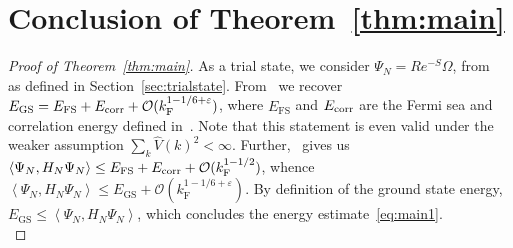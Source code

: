 \documentclass[12pt,a4paper]{article}
\numberwithin{equation}{section}
\newcommand{\cO}{\mathcal{O}}
\newcommand{\1}{\mathbb{I}}
\newcommand{\corr}{\textnormal{corr}}
\newcommand{\F}{\mathrm{F}}
\newcommand{\FS}{\mathrm{FS}}
\newcommand{\GS}{\mathrm{GS}}
\newcommand{\eva}[1]{\left\langle #1 \right\rangle}
\theoremstyle{plain}
\theoremstyle{definition}
\theoremstyle{remark}
\theoremstyle{plain}
\theoremstyle{definition}
\theoremstyle{remark}
\begin{document}
\section{Conclusion of Theorem~\ref{thm:main}}
\label{sec:mainthmproof}

\begin{proof}[Proof of Theorem~\ref{thm:main}]
As a trial state, we consider $ \Psi_N = R e^{-S} \Omega $, from~\cite{CHN23} as defined in Section~\ref{sec:trialstate}. From~\cite[Corr.~1.3]{CHN24} we recover $ E_{\GS} = E_{\FS} + E_{\corr} + \cO(k_{\F}^{1 - 1/6 + \varepsilon}) $, where $ E_{\FS} $ and $ E_{\corr} $ are the Fermi sea and correlation energy defined in~\cite[(1.2) and (1.11)]{CHN24}. Note that this statement is even valid under the weaker assumption $ \sum_k \hat{V}(k)^2 < \infty $. Further,~\cite[Thm.~1.1]{CHN23} gives us $ \eva{\Psi_N, H_N \Psi_N} \le E_{\FS} + E_{\corr} + \cO(k_{\F}^{1 - 1/2}) $, whence $ \eva{\Psi_N, H_N \Psi_N} \le E_{\GS} + \cO(k_{\F}^{1 - 1/6+ \varepsilon}) $. By definition of the ground state energy, $ E_{\GS} \le \eva{\Psi_N, H_N \Psi_N} $, which concludes the energy estimate~\eqref{eq:main1}.\\


\end{proof}
\end{document}
